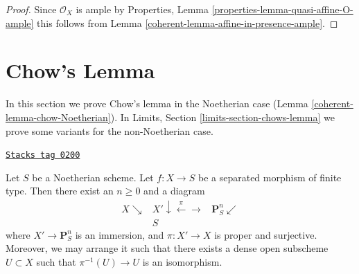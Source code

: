 \begin{proof}

Since $\mathcal{O}_X$ is ample by
Properties, Lemma \ref{properties-lemma-quasi-affine-O-ample}
this follows from Lemma \ref{coherent-lemma-affine-in-presence-ample}.
\end{proof}

\section{Chow's Lemma}
\label{coherent-section-chows-lemma}
In this section we prove Chow's lemma in the Noetherian
case (Lemma \ref{coherent-lemma-chow-Noetherian}).
In
Limits, Section \ref{limits-section-chows-lemma}
we prove some variants for the non-Noetherian case.

\begin{lemma}
\label{coherent-lemma-chow-Noetherian}
\href{https://stacks.math.columbia.edu/tag/0200}{\texttt{Stacks tag 0200}}

\begin{reference}
\cite[II Theorem 5.6.1(a)]{EGA}
\end{reference}
Let $S$ be a Noetherian scheme.
Let $f : X \to S$ be a separated morphism of finite type.
Then there exist an $n \geq 0$ and a diagram
$$
\begin{array}{ccc}X \searrow & X' \downarrow\overset{\pi}{\longleftarrow}\longrightarrow & \mathbf{P}^n_S \swarrow \\  & S & \end{array}
$$
where $X' \to \mathbf{P}^n_S$ is an immersion, and
$\pi : X' \to X$ is proper and surjective. Moreover, we may
arrange it such that there exists a dense open subscheme
$U \subset X$ such that $\pi^{-1}(U) \to U$ is an isomorphism.
\end{lemma}

